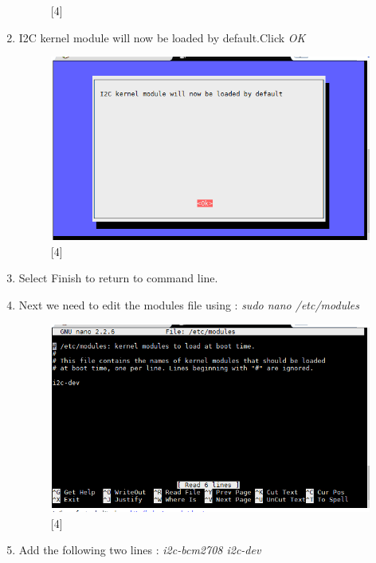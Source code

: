 \documentclass[a4paper,12pt,oneside]{book}
\begin{document}
\begin{enumerate}
\begin{figure}[h!]
			\centering
			\caption{[4]}
		\end{figure}
		\item I2C kernel module will now be loaded by default.Click \textit{OK}
		\begin{figure}[h!]
			\includegraphics[scale=0.6]{i2c_6}
			\centering
			\caption{[4]}
		\end{figure}
		\item Select Finish to return to command line.
		\item Next we need to edit the modules file using : \newline \textit{sudo nano /etc/modules} 
		\begin{figure}[h!]
			\includegraphics[scale=0.6]{i2c_7}
			\centering
			\caption{[4]}
		\end{figure}
		\newpage
		\item Add the following two lines : \newline \textit{i2c-bcm2708 \newline i2c-dev}
		

\end{enumerate}
\end{document}
